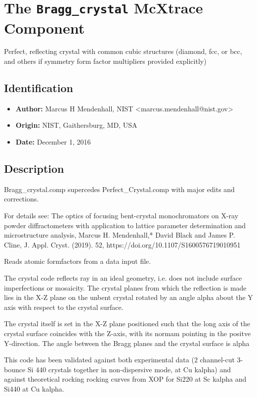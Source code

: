 \section{The \texttt{Bragg\_crystal} McXtrace Component}
Perfect, reflecting crystal with common cubic structures (diamond, fcc, or bcc, and others if symmetry form factor multipliers provided explicitly)

\subsection*{Identification}
\begin{itemize}
  \item \textbf{Author:} Marcus H Mendenhall, NIST \textless{}marcus.mendenhall@nist.gov\textgreater{}
  \item \textbf{Origin:} NIST, Gaithersburg, MD, USA
  \item \textbf{Date:} December 1, 2016
\end{itemize}

\subsection*{Description}
Bragg\_crystal.comp supercedes Perfect\_Crystal.comp with major edits and corrections.

For details see: The optics of focusing bent-crystal monochromators on X-ray powder diffractometers with application to lattice parameter determination and microstructure analysis, Marcus H. Mendenhall,* David Black and James P. Cline, J. Appl. Cryst. (2019). 52, https://doi.org/10.1107/S1600576719010951

Reads atomic formfactors from a data input file.

The crystal code reflects ray in an ideal geometry, i.e. does not include surface imperfections or mosaicity. The crystal planes from which the reflection is made lies in the X-Z plane on the unbent crystal rotated by an angle alpha about the Y axis with respect to the crystal surface.

The crystal itself is set in the X-Z plane positioned such that the long axis of the crystal surface coincides with the Z-axis, with its normam pointing in the positve Y-direction. The angle between the Bragg planes and the crystal surface is alpha

This code has been validated against both experimental data (2 channel-cut 3-bounce Si 440 crystals together in non-dispersive mode, at Cu kalpha) and against theoretical rocking rocking curves from XOP for Si220 at Sc kalpha and Si440 at Cu kalpha.

